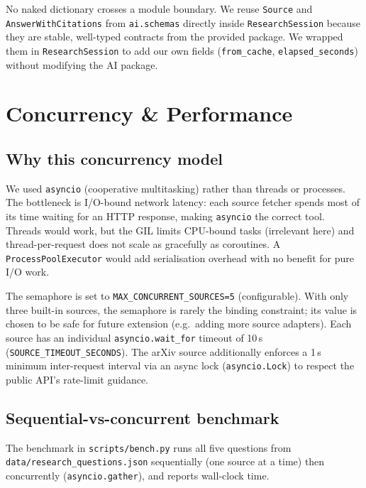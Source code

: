 \documentclass[11pt,a4paper]{article}
\begin{document}
No naked dictionary crosses a module boundary. We reuse \texttt{Source} and \texttt{AnswerWithCitations} from \texttt{ai.schemas} directly inside \texttt{ResearchSession} because they are stable, well-typed contracts from the provided package. We wrapped them in \texttt{ResearchSession} to add our own fields (\texttt{from\_cache}, \texttt{elapsed\_seconds}) without modifying the AI package.

\section{Concurrency \& Performance}\label{sec:concurrency}

\subsection{Why this concurrency model}

We used \texttt{asyncio} (cooperative multitasking) rather than threads or processes. The bottleneck is I/O-bound network latency: each source fetcher spends most of its time waiting for an HTTP response, making \texttt{asyncio} the correct tool. Threads would work, but the GIL limits CPU-bound tasks (irrelevant here) and thread-per-request does not scale as gracefully as coroutines. A \texttt{ProcessPoolExecutor} would add serialisation overhead with no benefit for pure I/O work.

The semaphore is set to \texttt{MAX\_CONCURRENT\_SOURCES=5} (configurable). With only three built-in sources, the semaphore is rarely the binding constraint; its value is chosen to be safe for future extension (e.g.\ adding more source adapters). Each source has an individual \texttt{asyncio.wait\_for} timeout of 10\,s (\texttt{SOURCE\_TIMEOUT\_SECONDS}). The arXiv source additionally enforces a 1\,s minimum inter-request interval via an async lock (\texttt{asyncio.Lock}) to respect the public API's rate-limit guidance.

\subsection{Sequential-vs-concurrent benchmark}

The benchmark in \texttt{scripts/bench.py} runs all five questions from \texttt{data/research\_questions.json} sequentially (one source at a time) then concurrently (\texttt{asyncio.gather}), and reports wall-clock time.
\end{document}
